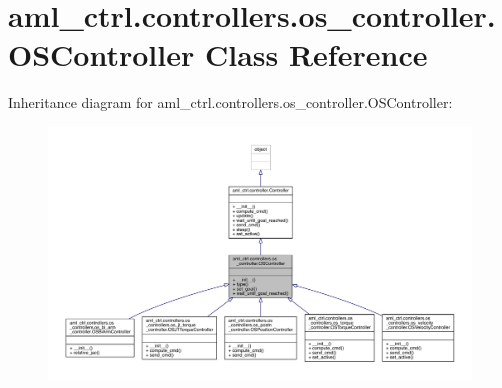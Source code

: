 \hypertarget{classaml__ctrl_1_1controllers_1_1os__controller_1_1_o_s_controller}{}\section{aml\+\_\+ctrl.\+controllers.\+os\+\_\+controller.\+O\+S\+Controller Class Reference}
\label{classaml__ctrl_1_1controllers_1_1os__controller_1_1_o_s_controller}


Inheritance diagram for aml\+\_\+ctrl.\+controllers.\+os\+\_\+controller.\+O\+S\+Controller\+:\nopagebreak
\begin{figure}[H]
\begin{center}
\leavevmode
\includegraphics[width=350pt]{classaml__ctrl_1_1controllers_1_1os__controller_1_1_o_s_controller__inherit__graph}
\end{center}
\end{figure}


